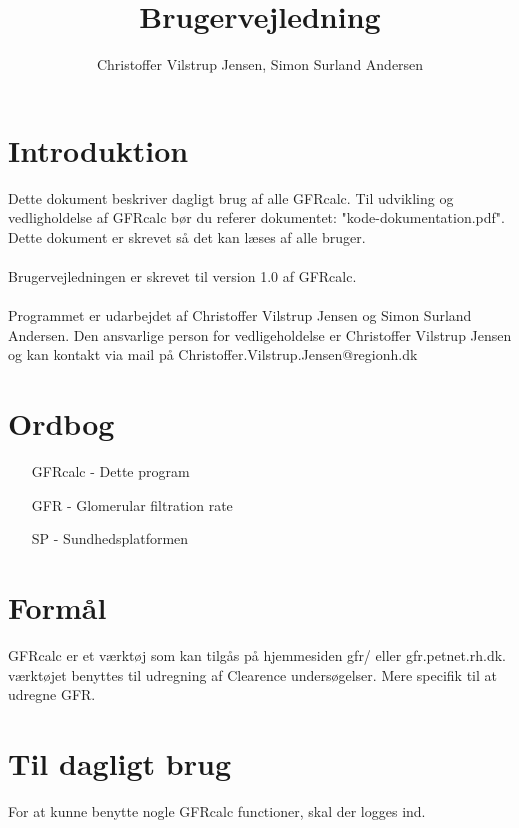 \documentclass{article}
\author{Christoffer Vilstrup Jensen, Simon Surland Andersen}
\title{Brugervejledning}
\begin{document}
\tableofcontents
\section*{Introduktion}
Dette dokument beskriver dagligt brug af alle GFRcalc. Til udvikling og vedligholdelse af GFRcalc bør du referer dokumentet: "kode-dokumentation.pdf". Dette dokument er skrevet så det kan læses af alle bruger.\\\\
Brugervejledningen er skrevet til version 1.0 af GFRcalc.\\\\
Programmet er udarbejdet af Christoffer Vilstrup Jensen og Simon Surland Andersen. Den ansvarlige person for vedligeholdelse er Christoffer Vilstrup Jensen og kan kontakt via mail på Christoffer.Vilstrup.Jensen@regionh.dk
\section*{Ordbog}
\begin{itemize}
	\item[GFRcalc] - Dette program
	\item[GFR]     - Glomerular filtration rate
	\item[SP]      - Sundhedsplatformen
\end{itemize}
\section*{Formål}
GFRcalc er et værktøj som kan tilgås på hjemmesiden gfr/ eller gfr.petnet.rh.dk. værktøjet benyttes til udregning af Clearence undersøgelser. Mere specifik til at udregne GFR. 
\newpage
\section{Til dagligt brug}
For at kunne benytte nogle GFRcalc functioner, skal der logges ind.  
\end{document}
